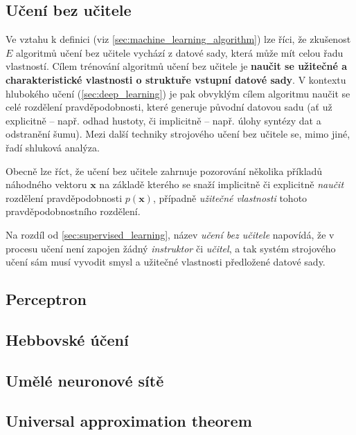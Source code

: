 \subsection{Učení bez učitele}
Ve vztahu k definici (viz \autoref{sec:machine_learning_algorithm}) lze říci, že zkušenost $E$ algoritmů učení bez učitele vychází z datové sady, která může mít celou řadu vlastností.
Cílem trénování algoritmů učení bez učitele je \textbf{naučit se užitečné a charakteristické vlastnosti o struktuře vstupní datové sady}.
V kontextu hlubokého učení (\autoref{sec:deep_learning}) je pak obvyklým cílem algoritmu naučit se celé rozdělení pravděpodobnosti, které generuje původní datovou sadu (ať už explicitně – např. odhad hustoty, či implicitně – např. úlohy syntézy dat a odstranění šumu).
Mezi další techniky strojového učení bez učitele se, mimo jiné, řadí shluková analýza.

Obecně lze říct, že učení bez učitele zahrnuje pozorování několika příkladů náhodného vektoru $\mathbf{x}$ na základě kterého se snaží implicitně či explicitně \emph{naučit} rozdělení pravděpodobnosti $p(\mathbf{x})$, případně \emph{užitečné vlastnosti} tohoto pravděpodobnostního rozdělení.

Na rozdíl od \autoref{sec:supervised_learning}, název \emph{učení bez učitele} napovídá, že v procesu učení není zapojen žádný \emph{instruktor} či \emph{učitel}, a tak systém strojového učení sám musí vyvodit smysl a užitečné vlastnosti předložené datové sady. \cite{Goodfellow2016}
\subsection{Perceptron}
\subsection{Hebbovské účení}
\subsection{Umělé neuronové sítě}
\subsection{Universal approximation theorem}
\label{sec:universal_approximation_theorem}

